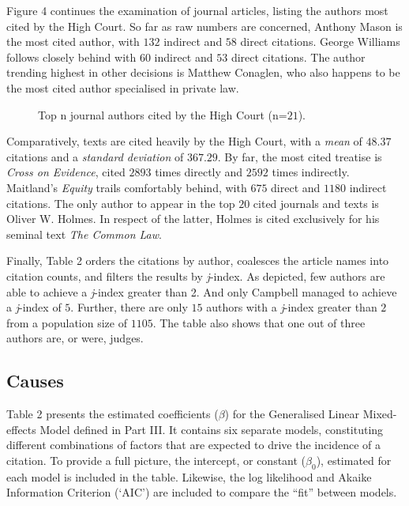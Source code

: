 Figure 4 continues the examination of journal articles, listing the authors most cited by the High Court. So far as raw numbers are concerned, Anthony Mason is the most cited author, with $132$ indirect and $58$ direct citations. George Williams follows closely behind with $60$ indirect and $53$ direct citations. The author trending highest in other decisions is Matthew Conaglen, who also happens to be the most cited author specialised in private law.

\begin{figure}[!htpb]
    \centering
    \makebox[\textwidth][c]{}
    \caption{Top n journal authors cited by the High Court (n=$21$).}
\end{figure}

Comparatively, texts are cited heavily by the High Court, with a \emph{mean} of $48.37$ citations and a \emph{standard deviation} of $367.29$. By far, the most cited treatise is \textit{Cross on Evidence}, cited $2893$ times directly and $2592$ times indirectly. Maitland's  \textit{Equity} trails comfortably behind, with $675$ direct and $1180$ indirect citations. The only author to appear in the top $20$ cited journals and texts is Oliver W. Holmes. In respect of the latter, Holmes is cited exclusively for his seminal text \textit{The Common Law}.

Finally, Table 2 orders the citations by author, coalesces the article names into citation counts, and filters the results by \emph{j}-index. As depicted, few authors are able to achieve a \emph{j}-index greater than 2. And only Campbell managed to achieve a \emph{j}-index of $5$. Further, there are only $15$ authors with a \emph{j}-index greater than $2$ from a population size of $1105$. The table also shows that one out of three authors are, or were, judges.

\subsection{Causes}

Table 2 presents the estimated coefficients ($\beta$) for the Generalised Linear Mixed-effects Model defined in Part III. It contains six separate models, constituting different combinations of factors that are expected to drive the incidence of a citation. To provide a full picture, the intercept, or constant ($\beta_0$), estimated for each model is included in the table. Likewise, the log likelihood and Akaike Information Criterion (`AIC') are included to compare the ``fit'' between models.

